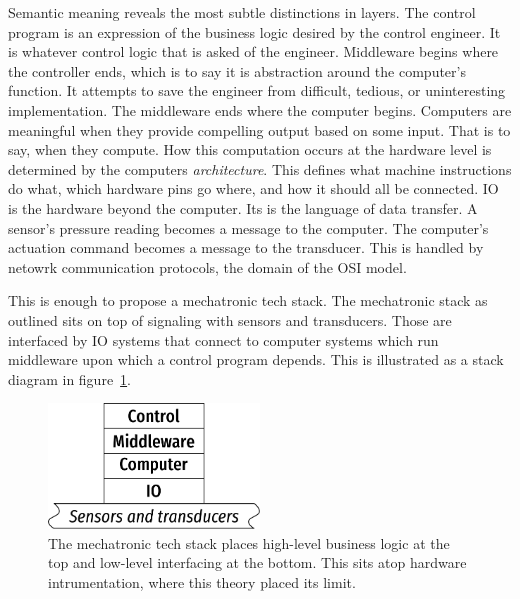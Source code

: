 \documentclass[english,12pt,a4paper,pdftex,eng,utf8]{aaltothesis}
\begin{document}
Semantic meaning reveals the most subtle distinctions in layers.  The control program is an expression of the business logic desired by the control engineer.  It is whatever control logic that is asked of the engineer.  Middleware begins where the controller ends, which is to say it is abstraction around the computer's function.  It attempts to save the engineer from difficult, tedious, or uninteresting implementation.  The middleware ends where the computer begins.  Computers are meaningful when they provide compelling output based on some input.  That is to say, when they compute.  How this computation occurs at the hardware level is determined by the computers {\it architecture}.  This defines what machine instructions do what, which hardware pins go where, and how it should all be connected.  IO is the hardware beyond the computer.  Its is the language of data transfer.  A sensor's pressure reading becomes a message to the computer.  The computer's actuation command becomes a message to the transducer.  This is handled by netowrk communication protocols, the domain of the OSI model.

This is enough to propose a mechatronic tech stack.  The mechatronic stack as outlined sits on top of signaling with sensors and transducers.  Those are interfaced by IO systems that connect to computer systems which run middleware upon which a control program depends.  This is illustrated as a stack diagram in figure~\ref{fig:mechatronic_tech_stack}.

\begin{figure}[h]
  \centering
  \includegraphics[width=0.5\textwidth]{assets/mechatronic_tech_stack}
  \caption{The mechatronic tech stack places high-level business logic at the top and low-level interfacing at the bottom.  This sits atop hardware intrumentation, where this theory placed its limit.}\label{fig:mechatronic_tech_stack}
\end{figure}
\end{document}
